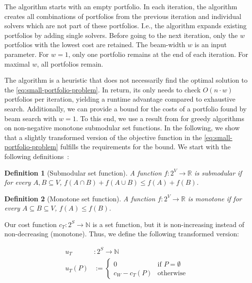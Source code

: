 \documentclass[conference]{IEEEtran}
\newtheorem{definition}{Definition}
\begin{document}
The algorithm starts with an empty portfolio.
In each iteration, the algorithm creates all combinations of portfolios from the previous iteration and individual solvers which are not part of these portfolios.
I.e., the algorithm expands existing portfolios by adding single solvers.
Before going to the next iteration, only the $w$ portfolios with the lowest cost are retained.
The beam-width $w$ is an input parameter.
For $w=1$, only one portfolio remains at the end of each iteration.
For maximal $w$, all portfolios remain.

The algorithm is a heuristic that does not necessarily find the optimal solution to the \ref{eq:small-portfolio-problem}.
In return, its only needs to check $O(n \cdot w)$ portfolios per iteration, yielding a runtime advantage compared to exhaustive search.
Additionally, we can provide a bound for the costs of a portfolio found by beam search with $w=1$.
To this end, we use a result from \cite{nemhauser1978analysis} for greedy algorithms on non-negative monotone submodular set functions.
In the following, we show that a slightly transformed version of the objective function in the \ref{eq:small-portfolio-problem} fulfills the requirements for the bound.
We start with the following definitions~\cite{krause2014submodular}:

\begin{definition}[Submodular set function]
	A function $f : 2^V \rightarrow \mathbb{R}$ is submodular if for every $A, B \subseteq V$, $f(A \cap B) + f(A \cup B) \leq f(A) + f(B)$.
	\label{def:submodular}
\end{definition}

\begin{definition}[Monotone set function]
	A function $f : 2^V \rightarrow \mathbb{R}$ is monotone if for every $A \subseteq B \subseteq V$, $f(A) \leq f(B)$.
	\label{sef:monotone}
\end{definition}

Our cost function $c_{T}: 2^S \rightarrow \mathbb{N}$ is a set function, but it is non-increasing instead of non-decreasing (monotone).
Thus, we define the following transformed version:

\begin{align*}
	u_{T} &: 2^S \rightarrow \mathbb{N}\\
	u_{T}(P) &:= \begin{cases}
		0 & \text{if }P=\emptyset\\
		c_W - c_{T}(P) & \text{otherwise}
	\end{cases} \tag*{Portfolio Utility}
\end{align*}
\end{document}
